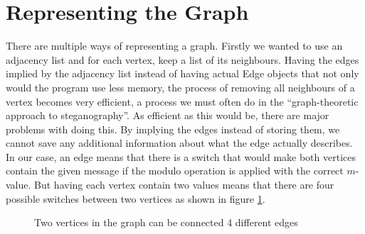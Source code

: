 \section{Representing the Graph}
There are multiple ways of representing a graph. 
Firstly we wanted to use an adjacency list and for each vertex, keep a list of its neighbours. 
Having the edges implied by the adjacency list instead of having actual Edge objects that not only would the program use less memory, the process of removing all neighbours of a vertex becomes very efficient, a process we must often do in the ``graph-theoretic approach to steganography''. 
As efficient as this would be, there are major problems with doing this. 
By implying the edges instead of storing them, we cannot save any additional information about what the edge actually describes. 
In our case, an edge means that there is a switch that would make both vertices contain the given message if the modulo operation is applied with the correct $m$-value. 
But having each vertex contain two values means that there are four possible switches between two vertices as shown in figure \ref{fig:graphSwitches}.

\begin{figure}
\begin {center}
\end{center}
\caption{Two vertices in the graph can be connected 4 different edges}
\label{fig:graphSwitches}
\end{figure}


